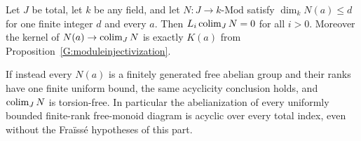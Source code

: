 \begin{proposition}
\label{G:boundedcoefficients}
Let $J$ be total, let $k$ be any field, and let
$N:J\to k\text{-}\mathrm{Mod}$ satisfy
$\dim_kN(a)\le d$ for one finite integer $d$ and every $a$.
Then $L_i\operatorname*{colim}_JN=0$ for all $i>0$.
Moreover the kernel of $N(a)\to\operatorname*{colim}_JN$ is exactly $K(a)$
from Proposition~\ref{G:moduleinjectivization}.

If instead every $N(a)$ is a finitely generated free abelian
group and their ranks have one finite uniform bound, the same
acyclicity conclusion holds, and $\operatorname*{colim}_JN$ is torsion-free.
In particular the abelianization of every uniformly bounded
finite-rank free-monoid diagram is acyclic over every total
index, even without the Fra\"iss\'e hypotheses of this part.
\end{proposition}
